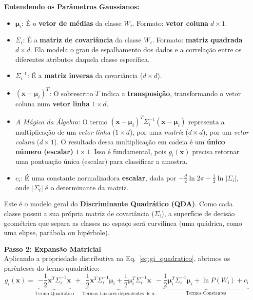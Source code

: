 \documentclass[12pt, a4paper]{article}
\begin{document}
\noindent \textbf{Entendendo os Parâmetros Gaussianos:}
\begin{itemize}
    \item $\boldsymbol{\mu}_i$: É o \textbf{vetor de médias} da classe $W_i$. Formato: \textbf{vetor coluna} $d \times 1$.
    \item $\Sigma_i$: É a \textbf{matriz de covariância} da classe $W_i$. Formato: \textbf{matriz quadrada} $d \times d$. Ela modela o grau de espalhamento dos dados e a correlação entre os diferentes atributos daquela classe específica.    
    \item $\Sigma_i^{-1}$: É a \textbf{matriz inversa} da covariância ($d \times d$).
    \item $(\mathbf{x}-\boldsymbol{\mu}_i)^T$: O sobrescrito $T$ indica a \textbf{transposição}, transformando o vetor coluna num \textbf{vetor linha} $1 \times d$. 
    \item \textit{A Mágica da Álgebra:} O termo $(\mathbf{x}-\boldsymbol{\mu}_i)^T \Sigma_i^{-1}(\mathbf{x}-\boldsymbol{\mu}_i)$ representa a multiplicação de um \textit{vetor linha} ($1 \times d$), por uma \textit{matriz} ($d \times d$), por um \textit{vetor coluna} ($d \times 1$). O resultado dessa multiplicação em cadeia é um \textbf{único número (escalar)} $1 \times 1$. Isso é fundamental, pois $g_i(\mathbf{x})$ precisa retornar uma pontuação única (escalar) para classificar a amostra.
    \item $c_i$: É uma constante normalizadora \textbf{escalar}, dada por $-\tfrac{d}{2}\ln 2\pi - \tfrac{1}{2}\ln|\Sigma_i|$, onde $|\Sigma_i|$ é o determinante da matriz.
\end{itemize}

Este é o modelo geral do \textbf{Discriminante Quadrático (QDA)}. Como cada classe possui a sua própria matriz de covariância ($\Sigma_i$), a superfície de decisão geométrica que separa as classes no espaço será curvilínea (uma quádrica, como uma elipse, parábola ou hipérbole).

\vspace{0.3cm}
\noindent \textbf{Passo 2: Expansão Matricial} \\
Aplicando a propriedade distributiva na Eq.~\eqref{eq:gi_quadratico}, abrimos os parênteses do termo quadrático:
\begin{equation}
    g_i(\mathbf{x}) = \underbrace{-\frac{1}{2}\mathbf{x}^T\Sigma_i^{-1}\mathbf{x}}_{\text{Termo Quadrático}} +\underbrace{\frac{1}{2}\mathbf{x}^T\Sigma_i^{-1}\boldsymbol{\mu}_i + \frac{1}{2}\boldsymbol{\mu}_i^T\Sigma_i^{-1}\mathbf{x}}_{\text{Termos Lineares dependentes de } \mathbf{x}} - \underbrace{\frac{1}{2}\boldsymbol{\mu}_i^T\Sigma_i^{-1}\boldsymbol{\mu}_i + \ln P(W_i) + c_i}_{\text{Termos Constantes}} \label{eq:gi_expandido}
\end{equation}
\end{document}
